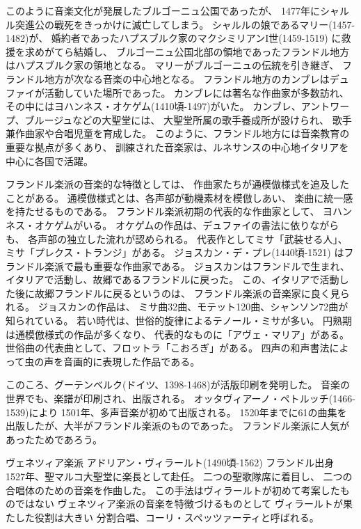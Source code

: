 \documentclass[a4j]{jarticle}
\begin{document}
このように音楽文化が発展したブルゴーニュ公国であったが、
1477年にシャルル突進公の戦死をきっかけに滅亡してしまう。
シャルルの娘であるマリー(1457-1482)が、
婚約者であったハプスブルク家のマクシミリアンI世(1459-1519)
に救援を求めがてら結婚し、
ブルゴーニュ公国北部の領地であったフランドル地方はハプスブルク家の領地となる。
マリーがブルゴーニュの伝統を引き継ぎ、
フランドル地方が次なる音楽の中心地となる。
フランドル地方のカンブレはデュファイが活動していた場所であった。
カンブレには著名な作曲家が多数訪れ、
その中にはヨハンネス・オケゲム(1410頃-1497)がいた。
カンブレ、アントワープ、ブルージュなどの大聖堂には、
大聖堂所属の歌手養成所が設けられ、
歌手兼作曲家や合唱児童を育成した。
このように、フランドル地方には音楽教育の重要な拠点が多くあり、
訓練された音楽家は、ルネサンスの中心地イタリアを中心に各国で活躍。

フランドル楽派の音楽的な特徴としては、
作曲家たちが通模倣様式を追及したことがある。
通模倣様式とは、各声部が動機素材を模倣しあい、
楽曲に統一感を持たせるものである。
フランドル楽派初期の代表的な作曲家として、
ヨハンネス・オケゲムがいる。
オケゲムの作品は、デュファイの書法に依りながらも、
各声部の独立した流れが認められる。
代表作としてミサ「武装せる人」、
ミサ「プレクス・トランジ」がある。
ジョスカン・デ・プレ(1440頃-1521)
はフランドル楽派で最も重要な作曲家である。
ジョスカンはフランドルで生まれ、
イタリアで活動し、故郷であるフランドルに戻った。
この、イタリアで活動した後に故郷フランドルに戻るというのは、
フランドル楽派の音楽家に良く見られる。
ジョスカンの作品は、
ミサ曲32曲、モテット120曲、シャンソン72曲が知られている。
若い時代は、世俗的旋律によるテノール・ミサが多い。
円熟期は通模倣様式の作品が多くなり、
代表的なものに「アヴェ・マリア」がある。
世俗曲の代表曲として、フロットラ「こおろぎ」がある。
四声の和声書法によって虫の声を音画的に表現した作品である。

このころ、グーテンベルク(ドイツ、1398-1468)が活版印刷を発明した。
音楽の世界でも、楽譜が印刷され、出版される。
オッタヴィアーノ・ペトルッチ(1466-1539)により
1501年、多声音楽が初めて出版される。
1520年までに61の曲集を出版したが、大半がフランドル楽派のものであった。
フランドル楽派に人気があったためであろう。

ヴェネツィア楽派
アドリアン・ヴィラールト(1490頃-1562)
フランドル出身
1527年、聖マルコ大聖堂に楽長として赴任。
二つの聖歌隊席に着目し、
二つの合唱体のための音楽を作曲した。
この手法はヴィラールトが初めて考案したものではない
ヴェネツィア楽派の音楽を特徴づけるものとして
ヴィラールトが果たした役割は大きい
分割合唱、コーリ・スペッツァーティと呼ばれる。
\end{document}
